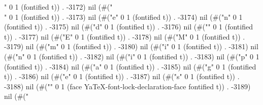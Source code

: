 " 0 1 (fontified t)) . -3172) nil (#("\\" 0 1 (fontified t)) . -3173) nil (#("e" 0 1 (fontified t)) . -3174) nil (#("n" 0 1 (fontified t)) . -3175) nil (#("d" 0 1 (fontified t)) . -3176) nil (#("{" 0 1 (fontified t)) . -3177) nil (#("E" 0 1 (fontified t)) . -3178) nil (#("M" 0 1 (fontified t)) . -3179) nil (#("m" 0 1 (fontified t)) . -3180) nil (#("i" 0 1 (fontified t)) . -3181) nil (#("n" 0 1 (fontified t)) . -3182) nil (#("i" 0 1 (fontified t)) . -3183) nil (#("p" 0 1 (fontified t)) . -3184) nil (#("a" 0 1 (fontified t)) . -3185) nil (#("g" 0 1 (fontified t)) . -3186) nil (#("e" 0 1 (fontified t)) . -3187) nil (#("s" 0 1 (fontified t)) . -3188) nil (#("}" 0 1 (face YaTeX-font-lock-declaration-face fontified t)) . -3189) nil (#("%
